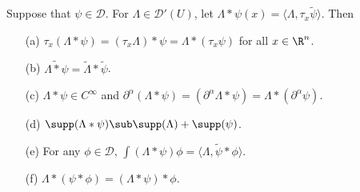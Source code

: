 \begin{proposition}\label{convolution of distribution and function prop}
Suppose that $\psi\in\mathscr{D}$. For $\Lambda\in\mathscr{D}'(U)$, let $\Lambda\ast\psi(x)=\langle\Lambda,\tau_x\tilde{\psi}\rangle$. Then
\begin{itemize}
\item[(a)] $\tau_x(\Lambda\ast\psi)=(\tau_x\Lambda)\ast\psi=\Lambda\ast(\tau_x\psi)$ for all $x\in\R^n$.
\item[(b)] $\widetilde{\Lambda\ast\psi}=\widetilde{\Lambda}\ast\tilde{\psi}$. 
\item[(c)] $\Lambda\ast\psi\in C^\infty$ and $\partial^\alpha(\Lambda\ast\psi)=(\partial^\alpha\Lambda\ast\psi)=\Lambda\ast(\partial^\alpha\psi)$.
\item[(d)] $\supp(\Lambda\ast\psi)\sub\supp(\Lambda)+\supp(\psi)$. 
\item[(e)] For any $\phi\in\mathscr{D}$, $\int(\Lambda\ast\psi)\phi=\langle\Lambda,\tilde{\psi}\ast\phi\rangle$.
\item[(f)] $\Lambda\ast(\psi\ast\phi)=(\Lambda\ast\psi)\ast\phi$. 
\end{itemize}
\end{proposition}
